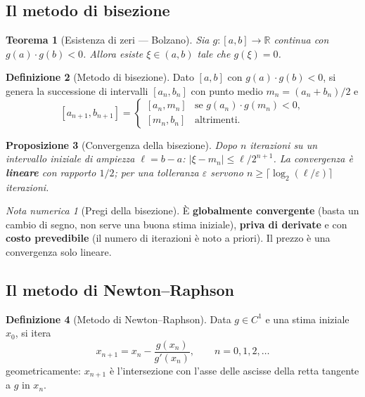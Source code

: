 \documentclass[11pt,a4paper]{article}
\theoremstyle{plain}
\newtheorem{teorema}{Teorema}[section]
\newtheorem{proposizione}[teorema]{Proposizione}
\theoremstyle{definition}
\newtheorem{definizione}[teorema]{Definizione}
\theoremstyle{remark}
\newtheorem*{attenzione}{Nota numerica}
\newcommand{\R}{\mathbb{R}}
\newcommand{\abs}[1]{\left\lvert #1 \right\rvert}
\begin{document}
\subsection{Il metodo di bisezione}
\label{sec:bisezione}

\begin{teorema}[Esistenza di zeri --- Bolzano]
Sia $g: [a,b] \to \R$ continua con $g(a)\cdot g(b) < 0$. Allora esiste
$\xi \in (a,b)$ tale che $g(\xi) = 0$.
\end{teorema}

\begin{definizione}[Metodo di bisezione]
Dato $[a,b]$ con $g(a)\cdot g(b) < 0$, si genera la successione di intervalli
$[a_n,b_n]$ con punto medio $m_n = (a_n+b_n)/2$ e
\[
  [a_{n+1}, b_{n+1}] = \begin{cases}
    [a_n, m_n] & \text{se } g(a_n)\cdot g(m_n) < 0,\\
    [m_n, b_n] & \text{altrimenti.}
  \end{cases}
\]
\end{definizione}

\begin{proposizione}[Convergenza della bisezione]
\label{prop:bisez}
Dopo $n$ iterazioni su un intervallo iniziale di ampiezza $\ell = b-a$:
$\abs{\xi - m_n} \le \ell/2^{n+1}$. La convergenza \`e \textbf{lineare} con rapporto
$1/2$; per una tolleranza $\varepsilon$ servono
$n \ge \lceil \log_2(\ell/\varepsilon) \rceil$ iterazioni.
\end{proposizione}

\begin{attenzione}[Pregi della bisezione]
\`E \textbf{globalmente convergente} (basta un cambio di segno, non serve una buona
stima iniziale), \textbf{priva di derivate} e con \textbf{costo prevedibile} (il numero
di iterazioni \`e noto a priori). Il prezzo \`e una convergenza solo lineare.
\end{attenzione}

\subsection{Il metodo di Newton--Raphson}
\label{sec:newton}

\begin{definizione}[Metodo di Newton--Raphson]
Data $g \in C^1$ e una stima iniziale $x_0$, si itera
\begin{equation}
  \label{eq:newton}
  x_{n+1} = x_n - \frac{g(x_n)}{g'(x_n)}, \qquad n = 0,1,2,\ldots
\end{equation}
geometricamente: $x_{n+1}$ \`e l'intersezione con l'asse delle ascisse della retta
tangente a $g$ in $x_n$.
\end{definizione}
\end{document}
